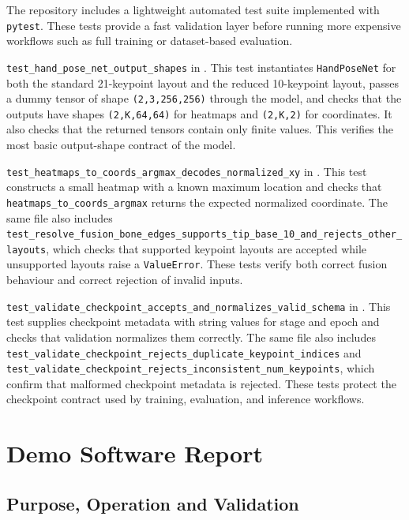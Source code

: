 ﻿\documentclass[11pt,a4paper]{article}
\begin{document}
The repository includes a lightweight automated test suite implemented with
\texttt{pytest}. These tests provide a fast validation layer before running
more expensive workflows such as full training or dataset-based evaluation.

\medskip

\noindent
\texttt{test\_hand\_pose\_net\_output\_shapes} in
. This test instantiates
\texttt{HandPoseNet} for both the standard 21-keypoint layout and the reduced
10-keypoint layout, passes a dummy tensor of shape \texttt{(2,3,256,256)}
through the model, and checks that the outputs have shapes
\texttt{(2,K,64,64)} for heatmaps and \texttt{(2,K,2)} for coordinates. It
also checks that the returned tensors contain only finite values. This
verifies the most basic output-shape contract of the model.

\medskip

\noindent
\texttt{test\_heatmaps\_to\_coords\_argmax\_decodes\_normalized\_xy} in
. This test constructs a small heatmap with a
known maximum location and checks that \texttt{heatmaps\_to\_coords\_argmax}
returns the expected normalized coordinate. The same file also includes
\texttt{test\_resolve\_fusion\_bone\_edges\_supports\_tip\_base\_10\_and\_rejects\_other\_layouts},
which checks that supported keypoint layouts are accepted while unsupported
layouts raise a \texttt{ValueError}. These tests verify both correct fusion
behaviour and correct rejection of invalid inputs.

\medskip

\noindent
\texttt{test\_validate\_checkpoint\_accepts\_and\_normalizes\_valid\_schema}
in . This test supplies checkpoint metadata
with string values for stage and epoch and checks that validation normalizes
them correctly. The same file also includes
\texttt{test\_validate\_checkpoint\_rejects\_duplicate\_keypoint\_indices}
and \texttt{test\_validate\_checkpoint\_rejects\_inconsistent\_num\_keypoints},
which confirm that malformed checkpoint metadata is rejected. These tests
protect the checkpoint contract used by training, evaluation, and inference
workflows.

\clearpage

\section{Demo Software Report}

\subsection{Purpose, Operation and Validation}
\end{document}
